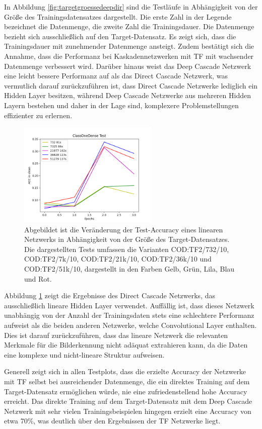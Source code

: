 In Abbildung \ref{fig:targetgroessedeepdir} sind die Testläufe in Abhängigkeit von der Größe des Trainingsdatensatzes dargestellt. Die erste 
Zahl in der Legende bezeichnet die Datenmenge, die zweite Zahl die Trainingsdauer. Die Datenmenge bezieht sich ausschließlich auf den 
Target-Datensatz. Es zeigt sich, dass die Trainingsdauer mit zunehmender Datenmenge ansteigt. Zudem bestätigt sich die Annahme, dass die 
Performanz bei Kaskadennetzwerken mit TF mit wachsender Datenmenge verbessert wird. Darüber hinaus weist das Deep Cascade 
Netzwerk eine leicht bessere Performanz auf als das Direct Cascade Netzwerk, was vermutlich darauf zurückzuführen ist, dass Direct Cascade 
Netzwerke lediglich ein Hidden Layer besitzen, während Deep Cascade Netzwerke aus mehreren Hidden Layern bestehen und daher in der Lage sind, 
komplexere Problemstellungen effizienter zu erlernen. 

\begin{figure}[htpb]
    \centering
    \includegraphics[height=5cm]{../../Plots/ba_plots/targetgroesse/cod_ts.png}
    \caption{\label{fig:targetgroesselinear} 
    \small{Abgebildet ist die Veränderung der Test-Accuracy eines linearen Netzwerks in Abhängigkeit von der Größe des Target-Datensatzes. 
    Die dargestellten Tests umfassen die Varianten COD:TF2/732/10, COD:TF2/7k/10, COD:TF2/21k/10, COD:TF2/36k/10 und COD:TF2/51k/10, 
    dargestellt in den Farben Gelb, Grün, Lila, Blau und Rot.}}
\end{figure}

Abbildung \ref{fig:targetgroesselinear} zeigt die Ergebnisse des Direct Cascade Netzwerks, das ausschließlich lineare Hidden Layer verwendet. 
Auffällig ist, dass dieses Netzwerk unabhängig von der Anzahl der Trainingsdaten stets eine schlechtere Performanz aufweist als die beiden 
anderen Netzwerke, welche Convolutional Layer enthalten. Dies ist darauf zurückzuführen, dass das lineare Netzwerk die relevanten Merkmale für 
die Bilderkennung nicht adäquat extrahieren kann, da die Daten eine komplexe und nicht-lineare Struktur aufweisen.

Generell zeigt sich in allen Testplots, dass die erzielte Accuracy der Netzwerke mit TF selbst bei ausreichender Datenmenge, die ein direktes 
Training auf dem 
Target-Datensatz ermöglichen würde, nie eine zufriedenstellend hohe Accuracy erreicht. Das direkte Training auf dem Target-Datensatz mit dem 
Deep Cascade Netzwerk mit sehr vielen Trainingsbeispielen hingegen erzielt eine Accuracy von etwa 70\%, was deutlich über den Ergebnissen der 
TF Netzwerke liegt.
